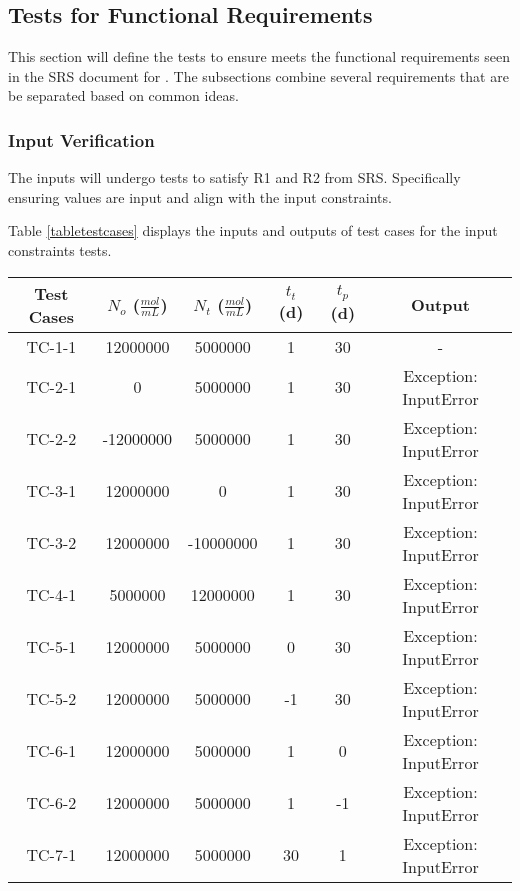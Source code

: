 \documentclass[12pt, titlepage]{article}
\begin{document}
\subsection{Tests for Functional Requirements} \label{tfr}

This section will define the tests to ensure \progname{} meets the functional 
requirements seen in the SRS document for \progname{} \citep{SRS}. The 
subsections combine 
several requirements that are be separated based on common ideas. 


\subsubsection{Input Verification}

The inputs will undergo tests to satisfy R1 and R2 from \progname{} SRS. 
Specifically ensuring values are input and align with the input constraints. 

Table \ref{tabletestcases} displays the inputs and outputs of test cases for the 
input constraints tests.

\begin{center}
 \begin{tabular}{|| c||c c c c|| c ||} 
 \hline
 \textbf{Test Cases} & \textbf{$N_{o}$ ($\frac{mol}{mL}$)} & \textbf{$N_{t}$ ($\frac{mol}{mL}$)} & \textbf{$t_{t}$ (d)} & \textbf{$t_{p}$ (d)} & \textbf{Output}\\ [0.5ex] 
 \hline
 TC-1-1 & 12000000 & 5000000 & 1 & 30 & - \\ 
 \hline
 TC-2-1 & 0 & 5000000 & 1 & 30 & Exception: InputError\\
 \hline
 TC-2-2 & -12000000 & 5000000 & 1 & 30 & Exception: InputError\\
 \hline
 TC-3-1 & 12000000 & 0 & 1 & 30 & Exception: InputError\\
 \hline
 TC-3-2 & 12000000 & -10000000 & 1 & 30 & Exception: InputError\\ 
 \hline
 TC-4-1 & 5000000 & 12000000 & 1 & 30 & Exception: InputError\\ 
 \hline
 TC-5-1 & 12000000 & 5000000 & 0 & 30 & Exception: InputError\\
 \hline
 TC-5-2 & 12000000 & 5000000 & -1 & 30 & Exception: InputError\\
 \hline
 TC-6-1 & 12000000 & 5000000 & 1 & 0 & Exception: InputError\\
 \hline
 TC-6-2 & 12000000 & 5000000 & 1 & -1 & Exception: InputError\\ 
 \hline
 TC-7-1 & 12000000 & 5000000 & 30 & 1 & Exception: InputError\\  [1ex] 
 \hline
\end{tabular}
\label{tabletestcases}

\end{center}		
\end{document}
